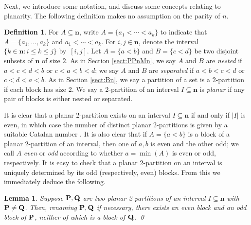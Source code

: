 \documentclass[11pt,a4paper]{article}
\newcommand{\bn}{\mathbf{n}}
\newcommand{\bP}{{\bf P}}
\newcommand{\bQ}{{\bf Q}}
\newcommand{\set}[2]{\{ {#1} : {#2} \}}
\newcommand{\1}{\id_n}
\newcommand{\sub}{\subseteq}
\newcommand{\epfres}{\hfill\qed}
\numberwithin{equation}{section}
\newtheorem{lemma}[equation]{Lemma}
\theoremstyle{definition}
\newtheorem{defn}[equation]{Definition}
\begin{document}
\begin{itemize}
\begin{itemize}
\begin{itemize}
\begin{itemize}
\begin{itemize}
\begin{itemize}
\begin{itemize}
Next, we introduce some notation, and discuss some concepts relating to planarity.  The following definition makes no assumption on the parity of $n$.

\begin{defn}
For $A\sub\bn$, write $A=\{a_1<\cdots<a_k\}$ to indicate that $A=\{a_1,\ldots,a_k\}$ and $a_1<\cdots<a_k$.  For $i,j\in\bn$, denote the interval $\set{k\in\bn}{i\leq k\leq j}$ by~$[i,j]$.  
%
Let $A=\{a<b\}$ and $B=\{c<d\}$ be two disjoint subsets of $\bn$ of size $2$.  As in Section \ref{sect:PPnMn}, we say $A$ and $B$ are \emph{nested} if $a<c<d<b$ or $c<a<b<d$; we say $A$ and $B$ are \emph{separated} if $a<b<c<d$ or $c<d<a<b$.  As in Section \ref{sect:Bn}, we say a partition of a set is a 2-partition if each block has size $2$.  We say a 2-partition of an interval $I\sub\bn$ is \emph{planar} if any pair of blocks is either nested or separated.  
\end{defn}


It is clear that a planar 2-partition exists on an interval $I\sub\bn$ if and only if $|I|$ is even, in which case the number of distinct planar 2-partitions is given by a suitable Catalan number \cite[Sequence A000108]{OEIS}.  
It is also clear that if $A=\{a<b\}$ is a block of a planar 2-partition of an interval, then one of $a,b$ is even and the other odd;
%
we call $A$ \emph{even} or \emph{odd} according to whether $a=\min(A)$ is even or odd, respectively.
It is easy to check that a planar 2-partition on an interval is uniquely determined by its odd (respectively, even) blocks. 
%
From this we immediately deduce the following.



\begin{lemma}\label{lem:odd}
Suppose $\bP,\bQ$ are two planar 2-partitions of an interval $I\sub\bn$ with $\bP\not=\bQ$.  Then, renaming $\bP,\bQ$ if necessary, there exists an even block and an odd block of $\bP$, neither of which is a block of $\bQ$. \epfres
\end{lemma}






\end{itemize}
\end{itemize}
\end{itemize}
\end{itemize}
\end{itemize}
\end{itemize}
\end{itemize}
\end{document}
